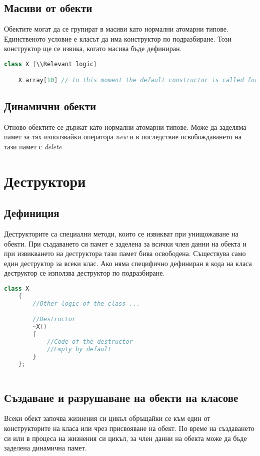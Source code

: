 \documentclass[fleqn,12pt]{article}
\begin{document}
\subsection{Масиви от обекти}
Обектите могат да се групират в масиви като нормални атомарни типове. Единственото условие е класът да има конструктор по подразбиране. Този конструктор ще се извика, когато масива бъде дефиниран.

\begin{lstlisting}[language=C++, caption=Example creation of an array of objects]
    class X {\\Relevant logic}

    X array[10] // In this moment the default constructor is called for the 10 elements created.
\end{lstlisting}


\subsection{Динамични обекти}
Отново обектите се държат като нормални атомарни типове. Може да заделяма памет за тях използвайки оператора \textit{new} и в последствие освобождаването на тази памет с \textit{delete}


\section{Деструктори}
\subsection{Дефиниция}
Деструкторите са специални методи, които се извикват при унищожаване на обекти. При създаването си памет е заделена за всички член данни на обекта и при извикването на деструктора тази памет бива освободена. Съществува само един деструктор за всеки клас. Ако няма специфично дефиниран в кода на класа деструктор се използва деструктор по подразбиране. 

\begin{lstlisting}[language=C++, caption=Example destructor]
    class X
    {
        //Other logic of the class ...

        //Destructor
        ~X()
        {
            //Code of the destructor
            //Empty by default
        }
    };
    
\end{lstlisting}
    

\subsection{Създаване и разрушаване на обекти на класове}
Всеки обект започва жизнения си цикъл обръщайки се към един от конструкторите на класа или чрез присвояване на обект. По време на създаването си или в процеса на жизнения си цикъл, за член данни на обекта може да бъде заделена динамична памет. 
\end{document}
